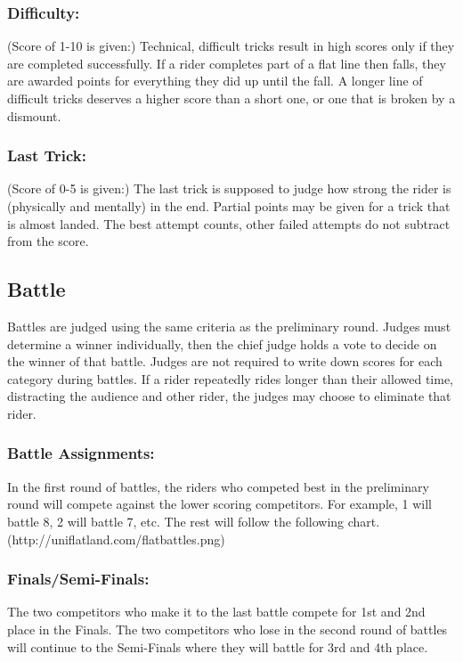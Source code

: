 \subsubsection{Difficulty:}
(Score of 1-10 is given:)
Technical, difficult tricks result in high scores only if they are completed successfully.
If a rider completes part of a flat line then falls, they are awarded points for everything they did up until the fall.
A longer line of difficult tricks deserves a higher score than a short one, or one that is broken by a dismount.

\subsubsection{Last Trick:}
(Score of 0-5 is given:)
The last trick is supposed to judge how strong the rider is (physically and mentally) in the end.
Partial points may be given for a trick that is almost landed.
The best attempt counts, other failed attempts do not subtract from the score.

\subsection{Battle \label{subsec:flat-street_flatland-judging-scoring_battle}}
Battles are judged using the same criteria as the preliminary round.
Judges must determine a winner individually, then the chief judge holds a vote to decide on the winner of that battle.
Judges are not required to write down scores for each category during battles.
If a rider repeatedly rides longer than their allowed time, distracting the audience and other rider, the judges may choose to eliminate that rider.

\subsubsection{Battle Assignments:}
In the first round of battles, the riders who competed best in the preliminary round will compete against the lower scoring competitors.
For example, 1 will battle 8, 2 will battle 7, etc.
The rest will follow the following chart. (http://uniflatland.com/flatbattles.png)

\subsubsection{Finals/Semi-Finals:}
The two competitors who make it to the last battle compete for 1st and 2nd place in the Finals.
The two competitors who lose in the second round of battles will continue to the Semi-Finals where they will battle for 3rd and 4th place.

